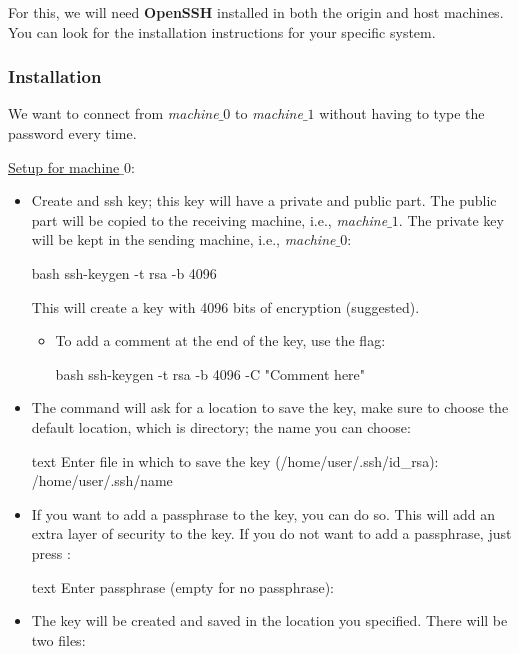 For this, we will need \textbf{OpenSSH} installed in both the origin and host machines. You can look
for the installation instructions for your specific system.

\subsubsection{Installation}

We want to connect from \textit{machine$\_0$} to \textit{machine$\_1$} without having to type
the password every time.\bigbreak

\underline{\underline{Setup for machine$\_0$}}:

\begin{itemize}
    \item Create and ssh key; this key will have a private and public part. The public part will be
    copied to the receiving machine, i.e., \textit{machine$\_1$}. The private key will be kept in
    the sending machine, i.e., \textit{machine$\_0$}:
    \begin{mintedbox}{bash}
ssh-keygen -t rsa -b 4096
    \end{mintedbox}
    This will create a key with 4096 bits of encryption (suggested).
    \begin{itemize}
        \item To add a comment at the end of the key, use the  flag:
        \begin{mintedbox}{bash}
ssh-keygen -t rsa -b 4096 -C "Comment here"
        \end{mintedbox}
    \end{itemize}
    \item The command will ask for a location to save the key, make sure to choose the default
    location, which is  directory; the name you can choose:
    \begin{mintedbox}{text}
Enter file in which to save the key (/home/user/.ssh/id_rsa): /home/user/.ssh/name
    \end{mintedbox}
    \item If you want to add a passphrase to the key, you can do so. This will add an extra layer of
    security to the key. If you do not want to add a passphrase, just press :
    \begin{mintedbox}{text}
Enter passphrase (empty for no passphrase):
    \end{mintedbox}
    \item The key will be created and saved in the location you specified. There will be two files:

\end{itemize}
